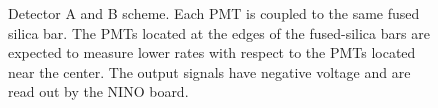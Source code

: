 \begin{figure}[!hbtp]
\centering
{}
\caption{Detector A and B scheme. Each PMT is coupled to the same fused silica bar. The PMTs located at the edges of the fused-silica bars are expected to measure lower rates with respect to the PMTs located near the center. The output signals have negative voltage and are read out by the NINO board.}
\label{fig:DetectorAB}
\end{figure}

